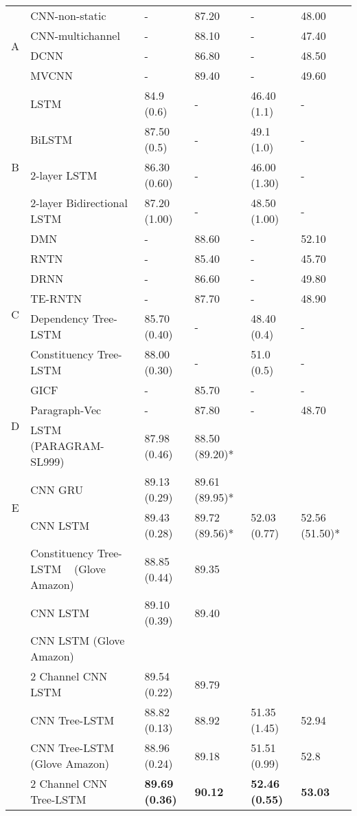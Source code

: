\begin{table*}[]
\begin{tabular}{c|l|ll|ll}
		\multirow{4}{*}{A} & CNN-non-static~\cite{KimCNN} & - & 87.20 & - & 48.00 \Tstrut \\
		& CNN-multichannel~\cite{KimCNN} & - & 88.10 & - & 47.40\\
		& DCNN~\cite{DCNN} & - & 86.80 & - & 48.50 \\
		& MVCNN~\cite{2-layer-cnn} & - & 89.40 & - & 49.60 \\
		\hline
		\multirow{5}{*}{B} & LSTM~\cite{treeLSTM}   & 84.9 (0.6) & - & 46.40 (1.1)& - \\
		& BiLSTM~\cite{treeLSTM}  & 87.50 (0.5) & - & 49.1 (1.0) & -  \\
		& 2-layer LSTM~\cite{treeLSTM} & 86.30 (0.60) & - & 46.00 (1.30) & -\\
		& 2-layer Bidirectional LSTM~\cite{treeLSTM} & 87.20 (1.00) & - & 48.50 (1.00) & -\\
		& DMN~\cite{attention-gru} & - & 88.60 & - & 52.10 \\
		\hline
		\multirow{5}{*}{C} & RNTN~\cite{socher2013recursive}  & - & 85.40 & - & 45.70 \\
		& DRNN~\cite{IrsoyDRNN} & - & 86.60 & - & 49.80  \\
		& TE-RNTN~\cite{tag-embedding-rnn} & - & 87.70 & - & 48.90\\
		& Dependency Tree-LSTM~\cite{treeLSTM}  & 85.70 (0.40)  & - & 48.40 (0.4) & - \\
		& Constituency Tree-LSTM~\cite{treeLSTM} & 88.00 (0.30)    &  - & 51.0 (0.5) & - \\
		\hline
		\multirow{3}{*}{D} & GICF~\cite{group-instance} & - & 85.70 & - & - \\
		& Paragraph-Vec~\cite{ParagraphVec} & - & 87.80 & - & 48.70 \\
		& LSTM (PARAGRAM-SL999)~\cite{wieting2015towards} & 87.98 (0.46) & 88.50 (89.20)* &   &  
		\\
		\hline
		\multirow{2}{*}{E}  & CNN GRU ~\cite{cnn-rnn}                    & 89.13 (0.29)  &  89.61 (89.95)*    \\
		& CNN LSTM ~\cite{cnn-rnn}                    & 89.43 (0.28)  & 89.72 (89.56)* & 52.03 (0.77) & 52.56 (51.50)* \Bstrut    \\
		\Xhline{3\arrayrulewidth}
		\Xhline{3\arrayrulewidth}
		\multirow{6}{*}{F} & Constituency Tree-LSTM ~\cite{treeLSTM} (Glove Amazon) & 88.85 (0.44) & 89.35 \\
		 & CNN LSTM                                 & 89.10 (0.39)  & 89.40  \\
		  & CNN LSTM (Glove Amazon)                  &   &   \\
		& 2 Channel CNN LSTM                        & 89.54    (0.22) & 89.79    \\
		 & CNN Tree-LSTM                            & 88.82 (0.13) & 88.92 & 51.35 (1.45) & 52.94 \\
		& CNN Tree-LSTM (Glove Amazon)             & 88.96 (0.24) & 89.18 & 51.51 (0.99) & 52.8 \\
		& 2 Channel CNN Tree-LSTM  &\textbf{89.69 (0.36)} & \textbf{90.12}  & \textbf{52.46 (0.55)} & \textbf{53.03}  \\
	\end{tabular}
\end{table*}
